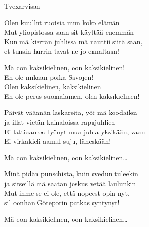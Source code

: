 \begin{song}{Tvexarvisan}
	
	
	
	
	Olen kuullut ruotsia mun koko elämän\\
	Mut yliopistossa saan sit käyttää enemmän\\
	Kun mä kierrän juhlissa mä nauttii siitä saan,\\
	et tunsin hurrin tavat ne jo ennaltaan!

	Mä oon kaksikielinen, oon kaksikielinen!\\
	En ole mikään poika Savojen!\\
	Olen kaksikielinen, kaksikielinen\\
	En ole perus suomalainen, olen kaksikielinen!

	Päivät väännän laskareita, yöt mä koodailen\\
	ja illat vietän kainaloissa rapujuhlien\\
	Ei lattiaan oo lyönyt mua juhla yksikään, vaan\\
	Ei virkakieli aamul suju, läheskään!

	Mä oon kaksikielinen, oon kaksikielinen\ldots

	Minä pidän punschista, kuin svedun tuleekin\\
	ja sitseillä mä saatan joskus vetää laulunkin\\
	Mut ihme se ei ole, että nopeest opin nyt,\\
	sil oonhan Göteporin putkas syntynyt!

	Mä oon kaksikielinen, oon kaksikielinen\ldots

	
\end{song}
